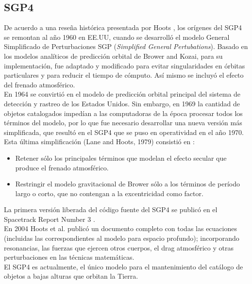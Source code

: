 \subsection{SGP4}\label{subsec:sgp4model}
De acuerdo a una rese\~na hist\'orica presentada por Hoots \citep{hootshistoria}, los or\'igenes del SGP4 se remontan al a\~no 1960 en EE.UU, cuando se desarroll\'o el modelo General Simplificado de Perturbaciones SGP  ({\it{Simplified General Pertubations}}). Basado en los modelos anal\'iticos de predicci\'on orbital de Brower and Kozai, para su implementaci\'on, fue adaptado y modificado para evitar singularidades en \'orbitas particulares y para reducir el tiempo de c\'omputo. As\'i mismo se incluy\'o el efecto del frenado atmosf\'erico.\\
En 1964 se convirti\'o en el modelo de predicci\'on orbital principal del sistema de detecci\'on y rastreo de los Estados Unidos.
Sin embargo, en 1969 la cantidad de objetos catalogados imped\'ian a las computadoras de la \'epoca procesar todos los t\'erminos del modelo, por lo que fue necesario desarrollar una nueva versi\'on m\'as simplificada, que result\'o en el SGP4 que se puso en operatividad en el a\~no 1970.\\

Esta \'ultima simplificaci\'on (Lane and Hoots, 1979) consisti\'o en :\\
\begin{itemize}
 \item Retener s\'olo los principales t\'erminos que modelan el efecto secular que produce el frenado atmosf\'erico.
 \item Restringir el modelo gravitacional de Brower s\'olo a los t\'erminos de per\'iodo largo o corto, que no contengan a la excentricidad como factor.
\end{itemize}

La primera versi\'on liberada del c\'odigo fuente del SGP4 se public\'o en el Spacetrack Report Number 3 \citep{spacetrackreport3}.\\
En 2004 Hoots et al. public\'o un documento completo con todas las ecuaciones (incluidas las correspondientes al modelo para espacio profundo); incorporando resonancias, las fuerzas que ejercen otros cuerpos, el drag atmosf\'erico y otras perturbaciones en las t\'ecnicas matem\'aticas.\\

El SGP4 es actualmente, el \'unico modelo para el mantenimiento del cat\'alogo de objetos a bajas alturas que orbitan la Tierra. 

